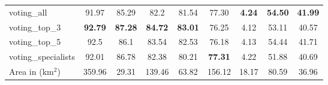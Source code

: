 \begin{table}[H]
{\begin{tabular}{lcccc|cccc}
            \\
            \midrule
            voting\_all         & 91.97                                & 85.29
                                & 82.2                                 & 81.54
                                & 77.30                                &
            \textbf{4.24}
                                & \textbf{54.50}                       &
            \textbf{41.99}
            \\
            voting\_top\_3      & \textbf{92.79}                       &
            \textbf{87.28}      & \textbf{84.72}                       &
            \textbf{83.01}      & 76.25                                & 4.12
                                & 53.11                                & 40.57
            \\
            voting\_top\_5      & 92.5                                 & 86.1
                                & 83.54                                & 82.53
                                & 76.18                                & 4.13
                                &
            54.44               & 41.71

            \\
            voting\_specialists & 92.01                                & 86.78
                                & 82.38                                & 80.21
                                & \textbf{77.31}                       &
            4.22                & 51.88                                & 40.69

            \\
            \bottomrule
            Area in (km$^2$)    & 359.96                               & 29.31
                                & 139.46                               & 63.82
                                & 156.12                               & 18.17
                                &
            80.59               & 36.96

            \\
        \end{tabular}
    }
\end{table}


